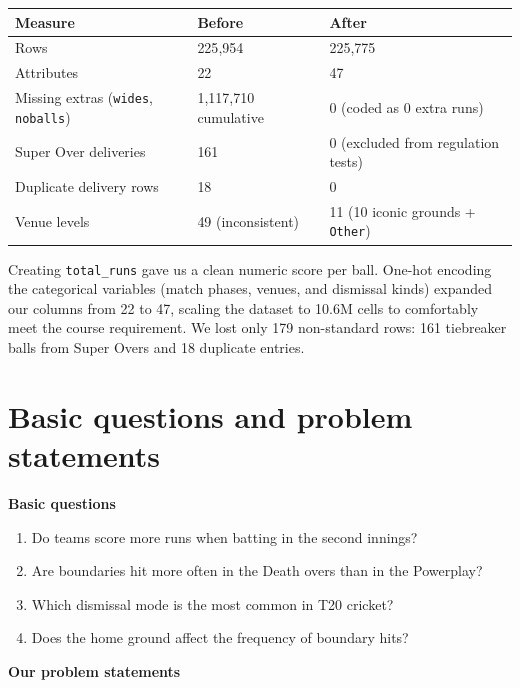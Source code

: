 \documentclass[10pt,a4paper,twocolumn]{article}
\newif\ifshowhints
\newcommand{\hint}[1]{\ifshowhints{\footnotesize\itshape\color{hintgrey}#1\par}\fi}
\newcommand{\egblock}[1]{{\color{eg}#1\par}}
\newcommand{\minihead}[1]{\par\needspace{8\baselineskip}\smallskip\textbf{#1}\par}
\newcommand{\code}[1]{\texttt{#1}}
\begin{document}
{\footnotesize
\begin{tabularx}{\linewidth}{@{}L{2.9cm} L{1.8cm} Y@{}}
\toprule
\textbf{Measure} & \textbf{Before} & \textbf{After} \\
\midrule
Rows & 225{,}954 & 225{,}775 \\
Attributes & 22 & 47 \\
Missing extras (\code{wides}, \code{noballs}) & 1{,}117{,}710 cumulative & 0 (coded as 0 extra runs) \\
Super Over deliveries & 161 & 0 (excluded from regulation tests) \\
Duplicate delivery rows & 18 & 0 \\
Venue levels & 49 (inconsistent) & 11 (10 iconic grounds + \code{Other}) \\
\bottomrule
\end{tabularx}}

\egblock{Creating \code{total\_runs} gave us a clean numeric score per ball. One-hot encoding the categorical variables (match phases, venues, and dismissal kinds) expanded our columns from 22 to 47, scaling the dataset to 10.6M cells to comfortably meet the course requirement. We lost only 179 non-standard rows: 161 tiebreaker balls from Super Overs and 18 duplicate entries.}

\section{Basic questions and problem statements}
\hint{What are your basic questions about your data, and how is your problem statement novel
from them? Show a few EDA plots, each with a one-line takeaway.}

\minihead{Basic questions}
\begin{enumerate}[label=\arabic*.]
  \item Do teams score more runs when batting in the second innings?
  \item Are boundaries hit more often in the Death overs than in the Powerplay?
  \item Which dismissal mode is the most common in T20 cricket?
  \item Does the home ground affect the frequency of boundary hits?
\end{enumerate}

\minihead{Our problem statements}
\hint{One or two sentences each, specific to your features, and phrased so each could come out
either way. Mark one as primary.}
\end{document}
